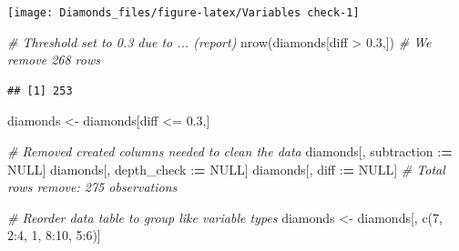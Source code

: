 \documentclass[
]{article}
\newenvironment{Shaded}{\begin{snugshade}}{\end{snugshade}}
\newcommand{\CommentTok}[1]{\textcolor[rgb]{0.56,0.35,0.01}{\textit{#1}}}
\newcommand{\ConstantTok}[1]{\textcolor[rgb]{0.00,0.00,0.00}{#1}}
\newcommand{\DecValTok}[1]{\textcolor[rgb]{0.00,0.00,0.81}{#1}}
\newcommand{\ErrorTok}[1]{\textcolor[rgb]{0.64,0.00,0.00}{\textbf{#1}}}
\newcommand{\FloatTok}[1]{\textcolor[rgb]{0.00,0.00,0.81}{#1}}
\newcommand{\FunctionTok}[1]{\textcolor[rgb]{0.00,0.00,0.00}{#1}}
\newcommand{\NormalTok}[1]{#1}
\newcommand{\OtherTok}[1]{\textcolor[rgb]{0.56,0.35,0.01}{#1}}
\newcommand{\SpecialCharTok}[1]{\textcolor[rgb]{0.00,0.00,0.00}{#1}}
\begin{document}
\begin{center}\texttt{[image: Diamonds\_files/figure-latex/Variables check-1]} \end{center}

\begin{Shaded}
\begin{Highlighting}[]
\CommentTok{\# Threshold set to 0.3 due to ... (report)}
\FunctionTok{nrow}\NormalTok{(diamonds[diff }\SpecialCharTok{\textgreater{}} \FloatTok{0.3}\NormalTok{,]) }\CommentTok{\# We remove 268 rows}
\end{Highlighting}
\end{Shaded}

\begin{verbatim}
## [1] 253
\end{verbatim}

\begin{Shaded}
\begin{Highlighting}[]
\NormalTok{diamonds }\OtherTok{\textless{}{-}}\NormalTok{ diamonds[diff }\SpecialCharTok{\textless{}=} \FloatTok{0.3}\NormalTok{,]}


\CommentTok{\# Removed created columns needed to clean the data}
\NormalTok{diamonds[, subtraction }\SpecialCharTok{:}\ErrorTok{=} \ConstantTok{NULL}\NormalTok{]}
\NormalTok{diamonds[, depth\_check }\SpecialCharTok{:}\ErrorTok{=} \ConstantTok{NULL}\NormalTok{]}
\NormalTok{diamonds[, diff }\SpecialCharTok{:}\ErrorTok{=} \ConstantTok{NULL}\NormalTok{]}
\CommentTok{\# Total rows remove: 275 observations}
\end{Highlighting}
\end{Shaded}

\begin{Shaded}
\begin{Highlighting}[]
\CommentTok{\# Reorder data table to group like variable types }
\NormalTok{diamonds }\OtherTok{\textless{}{-}}\NormalTok{ diamonds[, }\FunctionTok{c}\NormalTok{(}\DecValTok{7}\NormalTok{, }\DecValTok{2}\SpecialCharTok{:}\DecValTok{4}\NormalTok{, }\DecValTok{1}\NormalTok{, }\DecValTok{8}\SpecialCharTok{:}\DecValTok{10}\NormalTok{, }\DecValTok{5}\SpecialCharTok{:}\DecValTok{6}\NormalTok{)]}
\end{Highlighting}
\end{Shaded}
\end{document}

